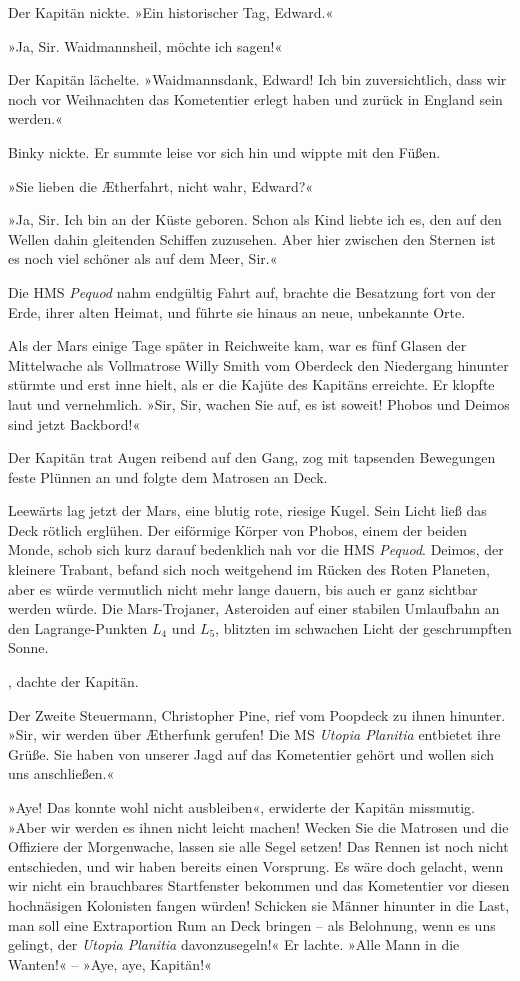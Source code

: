 Der Kapitän nickte. »Ein historischer Tag, Edward.«

»Ja, Sir. Waidmannsheil, möchte ich sagen!«

Der Kapitän lächelte. »Waidmannsdank, Edward! Ich bin
zuversichtlich, dass wir noch vor Weihnachten das Kometentier
erlegt haben und zurück in England sein werden.«

Binky nickte. Er summte leise vor sich hin und wippte mit den
Füßen.

»Sie lieben die Ætherfahrt, nicht wahr, Edward?«

»Ja, Sir. Ich bin an der Küste geboren. Schon als Kind liebte ich
es, den auf den Wellen dahin gleitenden Schiffen zuzusehen. Aber
hier zwischen den Sternen ist es noch viel schöner als auf dem
Meer, Sir.«

Die HMS \textit{Pequod} nahm endgültig Fahrt auf, brachte die Besatzung fort
von der Erde, ihrer alten Heimat, und führte sie hinaus an neue,
unbekannte Orte.

Als der Mars einige Tage später in Reichweite kam, war es fünf
Glasen der Mittelwache als Vollmatrose Willy Smith vom Oberdeck den
Niedergang hinunter stürmte und erst inne hielt, als er die Kajüte
des Kapitäns erreichte. Er klopfte laut und vernehmlich. »Sir, Sir,
wachen Sie auf, es ist soweit! Phobos und Deimos sind jetzt
Backbord!«

Der Kapitän trat Augen reibend auf den Gang, zog mit tapsenden
Bewegungen feste Plünnen an und folgte dem Matrosen an Deck.

Leewärts lag jetzt der Mars, eine blutig rote, riesige Kugel. Sein
Licht ließ das Deck rötlich erglühen. Der eiförmige Körper von
Phobos, einem der beiden Monde, schob sich kurz darauf bedenklich
nah vor die HMS \textit{Pequod}. Deimos, der kleinere Trabant, befand sich
noch weitgehend im Rücken des Roten Planeten, aber es würde
vermutlich nicht mehr lange dauern, bis auch er ganz sichtbar
werden würde. Die Mars-Trojaner, Asteroiden auf einer stabilen
Umlaufbahn an den Lagrange-Punkten $L_{4}$ und
$L_5$, blitzten im schwachen Licht der geschrumpften
Sonne.

, dachte der Kapitän.

Der Zweite Steuermann, Christopher Pine, rief vom Poopdeck zu ihnen
hinunter. »Sir, wir werden über Ætherfunk gerufen! Die MS \textit{Utopia
Planitia} entbietet ihre Grüße. Sie haben von unserer Jagd auf das
Kometentier gehört und wollen sich uns anschließen.«

»Aye! Das konnte wohl nicht ausbleiben«, erwiderte der Kapitän
missmutig. »Aber wir werden es ihnen nicht leicht machen! Wecken
Sie die Matrosen und die Offiziere der Morgenwache, lassen sie alle
Segel setzen! Das Rennen ist noch nicht entschieden, und wir haben
bereits einen Vorsprung. Es wäre doch gelacht, wenn wir nicht ein
brauchbares Startfenster bekommen und das Kometentier vor diesen
hochnäsigen Kolonisten fangen würden! Schicken sie Männer hinunter
in die Last, man soll eine Extraportion Rum an Deck bringen – als
Belohnung, wenn es uns gelingt, der \textit{Utopia Planitia} davonzusegeln!«
Er lachte. »Alle Mann in die Wanten!« – »Aye, aye, Kapitän!«

